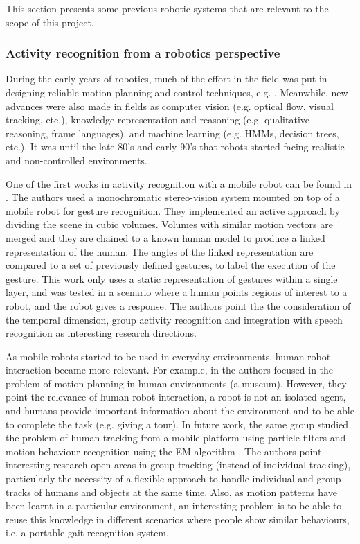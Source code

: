 This section presents some previous robotic systems that are relevant to the scope of this project.

\subsubsection{Activity recognition from a robotics perspective}

During the early years of robotics, much of the effort in the field was put in designing reliable motion planning and control techniques, e.g. \citep{Moravec1983_StanfordCMUCarts,brook-1985:robuslayer:TR}. 
Meanwhile, new advances were also made in fields as computer vision (e.g. optical flow, visual tracking, etc.), knowledge representation and reasoning (e.g. qualitative reasoning, frame languages), and machine learning (e.g. HMMs, decision trees, etc.).
It was until the late 80's and early 90's that robots started facing realistic and non-controlled environments.

One of the first works in activity recognition with a mobile robot can be found in \citep{Kortenkamp1996_RIG,Bonasso96recognizingand}. 
The authors used a monochromatic stereo-vision system mounted on top of a mobile robot for gesture recognition.
They implemented an active approach by dividing the scene in cubic volumes.
Volumes with similar motion vectors are merged and they are chained to a known human model to produce a linked representation of the human.
The angles of the linked representation are compared to a set of previously defined gestures, to label the execution of the gesture.
This work only uses a static representation of gestures within a single layer, and was tested in a scenario where a human points regions of interest to a robot, and the robot gives a response.
The authors point the the consideration of the temporal dimension, group activity recognition and integration with speech recognition as interesting research directions.

As mobile robots started to be used in everyday environments, human robot interaction became more relevant. 
For example, in \citep{Burgard98_ExpMuseumRobot} the authors focused in the problem of motion planning in human environments (a museum). 
However, they point the relevance of human-robot interaction, a robot is not an isolated agent, and humans provide important information about the environment and to be able to complete the task (e.g. giving a tour). 
In future work, the same group studied the problem of human tracking from a mobile platform using particle filters \citep{Schulz01_TrackingMultipleMoving,Schulz03_PeopleTrackSJPDAF} and motion behaviour recognition using the EM algorithm \citep{BennewitzBT02,bennewitz2004active}.
The authors point interesting research open areas in group tracking (instead of individual tracking), particularly the necessity of a flexible approach to handle individual and group tracks of humans and objects at the same time.
Also, as motion patterns have been learnt in a particular environment, an interesting problem is to be able to reuse this knowledge in different scenarios where people show similar behaviours, i.e. a portable gait recognition system.

